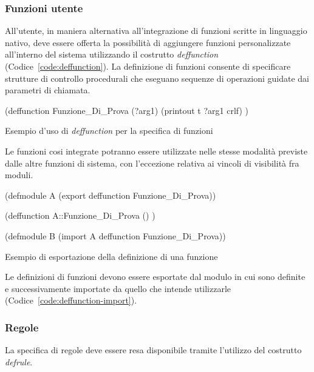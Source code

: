 \subsubsection{Funzioni utente}\label{par:linguaggio-funzioni}
All'utente, in maniera alternativa all'integrazione di funzioni scritte in linguaggio nativo, deve essere offerta la possibilità di aggiungere funzioni personalizzate all'interno del sistema utilizzando il costrutto \emph{deffunction} (Codice~\ref{code:deffunction}). La definizione di funzioni consente di specificare strutture di controllo procedurali che eseguano sequenze di operazioni guidate dai parametri di chiamata.

\begin{program}
\begin{verbatimtab}

(deffunction Funzione_Di_Prova (?arg1)
	(printout t ?arg1 crlf)
)
\end{verbatimtab}
\caption{Esempio d'uso di \emph{deffunction} per la specifica di funzioni}\label{code:deffunction}
\end{program}


Le funzioni cosi integrate potranno essere utilizzate nelle stesse modalità previste dalle altre funzioni di sistema, con l'eccezione relativa ai vincoli di visibilità fra moduli.

\begin{program}
\begin{verbatimtab}

(defmodule A
	(export deffunction Funzione_Di_Prova))
	
(deffunction A::Funzione_Di_Prova () )

(defmodule B
	(import A deffunction Funzione_Di_Prova))
\end{verbatimtab}
\caption{Esempio di esportazione della definizione di una funzione}\label{code:deffunction-import}
\end{program}

Le definizioni di funzioni devono essere esportate dal modulo in cui sono definite e successivamente importate da quello che intende utilizzarle (Codice~\ref{code:deffunction-import}).

\subsubsection{Regole}\label{par:linguaggio-regole}
La specifica di regole deve essere resa disponibile tramite l'utilizzo del costrutto \emph{defrule}.

